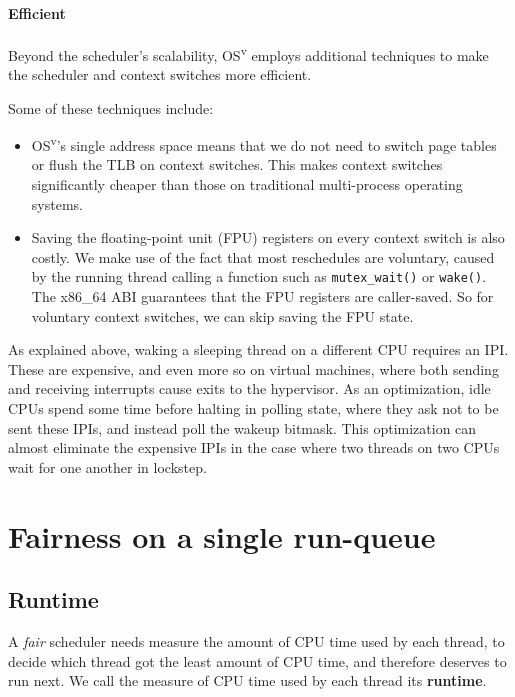 \documentclass{sig-alternate}
\begin{document}
\paragraph{Efficient}
Beyond the scheduler's scalability, OS\textsuperscript{v} employs additional techniques to
make the scheduler and context switches more efficient.

Some of these techniques include:

\begin{itemize}
  \item OS\textsuperscript{v}'s single address space means that we do not need to switch page tables
or flush the TLB on context switches. This makes context switches significantly cheaper
than those on traditional multi-process operating systems.

\item Saving the floating-point unit (FPU) registers on every context
switch is also costly. We make use of the fact that most reschedules are
voluntary, caused by the running thread calling a function such as
{\tt mutex\_wait()} or {\tt wake()}. The x86\_64 ABI guarantees that the FPU
registers are caller-saved. So for voluntary context switches, we can skip saving the FPU state.
\end{itemize}

As explained above, waking a sleeping thread on a different CPU requires
an IPI. These are expensive, and even more so on virtual machines, where
both sending and receiving interrupts cause exits to the hypervisor. As an optimization, idle
CPUs spend some time before halting in polling state, where they ask not to
be sent these IPIs, and instead poll the wakeup bitmask. This optimization
can almost eliminate the expensive IPIs in the case where two
threads on two CPUs wait for one another in lockstep.

\section{Fairness on a single run-queue}
\subsection{Runtime}
A \emph{fair} scheduler needs measure the amount of CPU time used by
each thread, to decide which thread got the least amount of CPU
time, and therefore deserves to run next. We call the measure of CPU time
used by each thread its {\bf runtime}.
\end{document}
